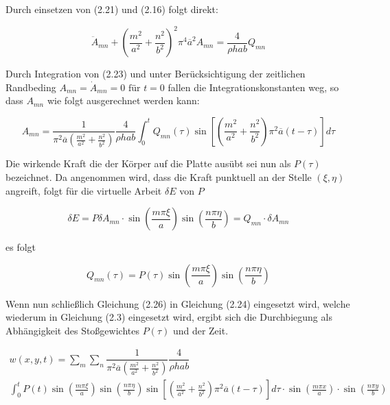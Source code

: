 Durch einsetzen von (2.21) und (2.16) folgt direkt:

\begin{equation}
\ddot{A}_{mn} + \left(\dfrac{m^2}{a^2} + \dfrac{n^2}{b^2}\right)^2 \pi^4 \overline{a}^2 A_{mn} = \dfrac{4}{\rho h a b} Q_{mn}
\end{equation}


Durch Integration von (2.23) und unter Berücksichtigung der zeitlichen Randbeding $A_{mn} = \dot{A}_{mn} = 0 \text{ für } t = 0$ fallen die Integrationskonstanten weg, so dass $A_{mn}$ wie folgt ausgerechnet werden kann:

\begin{equation}
A_{mn} = \dfrac{1}{\pi^2 \overline{a}  \left(\frac{m^2}{a^2} + \frac{n^2}{b^2} \right)} \dfrac{4}{\rho h a b} \int_0^t	Q_{mn}(\tau) \sin \left[ \left(\frac{m^2}{a^2} + \frac{n^2}{b^2} \right) \pi^2 \overline{a} (t-\tau)\right] d\tau
\end{equation}


Die wirkende Kraft die der Körper auf die Platte ausübt sei nun als $P(\tau)$ bezeichnet. 
Da angenommen wird, dass die Kraft punktuell an der Stelle $(\xi, \eta)$ angreift, folgt für die virtuelle Arbeit $\delta E$ von $P$

\begin{equation}
\delta E = P \delta A_{mn} \cdot \sin \left( \frac{m \pi \xi}{a} \right) \sin \left( \frac{n \pi \eta}{b} \right) = Q_{mn} \cdot \delta A_{mn}
\end{equation} 

es folgt

\begin{equation}
Q_{mn}(\tau) = P(\tau) \sin \left( \frac{m \pi \xi}{a} \right) \sin \left( \frac{n \pi \eta}{b} \right)
\end{equation}



Wenn nun schließlich Gleichung (2.26) in Gleichung (2.24) eingesetzt wird, welche wiederum in Gleichung (2.3) eingesetzt wird, ergibt sich die Durchbiegung als Abhängigkeit des Stoßgewichtes $P(\tau)$ und der Zeit.

\begin{multline}
w(x,y,t) = \sum_m \sum_n 
\dfrac{1}{\pi^2 \overline{a}  \left(\frac{m^2}{a^2} + \frac{n^2}{b^2} \right)} \dfrac{4}{\rho h a b} \\ \int_0^t
 P(t) \sin \left( \frac{m \pi \xi}{a} \right) \sin \left( \frac{n \pi \eta}{b} \right)
\sin \left[ \left(\frac{m^2}{a^2} + \frac{n^2}{b^2} \right) \pi^2 \overline{a} (t-\tau)\right] d\tau
\cdot \sin\left(\frac{m \pi x}{a}\right) \cdot \sin\left(\frac{n \pi y}{b}\right)
\end{multline}

